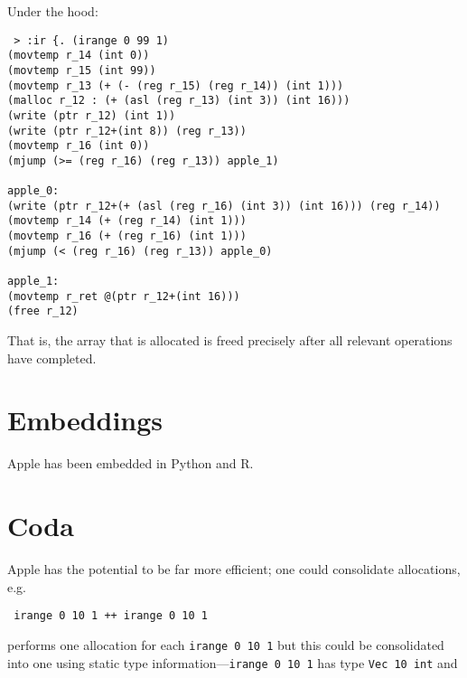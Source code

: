 \documentclass{article}
\begin{document}
Under the hood:

\begin{verbatim}
 > :ir {. (irange 0 99 1)
(movtemp r_14 (int 0))
(movtemp r_15 (int 99))
(movtemp r_13 (+ (- (reg r_15) (reg r_14)) (int 1)))
(malloc r_12 : (+ (asl (reg r_13) (int 3)) (int 16)))
(write (ptr r_12) (int 1))
(write (ptr r_12+(int 8)) (reg r_13))
(movtemp r_16 (int 0))
(mjump (>= (reg r_16) (reg r_13)) apple_1)

apple_0:
(write (ptr r_12+(+ (asl (reg r_16) (int 3)) (int 16))) (reg r_14))
(movtemp r_14 (+ (reg r_14) (int 1)))
(movtemp r_16 (+ (reg r_16) (int 1)))
(mjump (< (reg r_16) (reg r_13)) apple_0)

apple_1:
(movtemp r_ret @(ptr r_12+(int 16)))
(free r_12)
\end{verbatim}

That is, the array that is allocated is freed precisely after all relevant operations have completed.


\section{Embeddings}

Apple has been embedded in Python and R.

\section{Coda}

Apple has the potential to be far more efficient; one could consolidate allocations, e.g.

\begin{verbatim}
 irange 0 10 1 ++ irange 0 10 1
\end{verbatim}

performs one allocation for each {\tt irange 0 10 1} but this could be consolidated into one using static type information---{\tt irange 0 10 1} has type {\tt Vec 10 int} and
\end{document}
